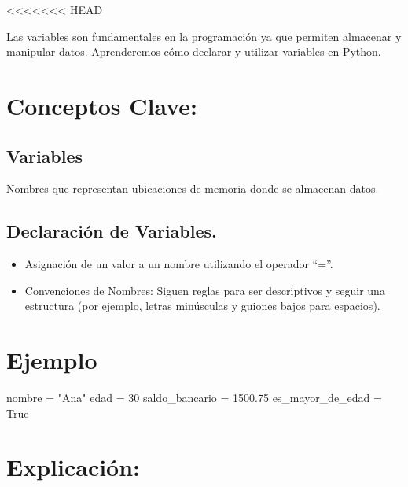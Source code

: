 \documentclass[
  a4paper,
  onepage,
  openany]{scrreprt}
\newenvironment{Shaded}{\begin{snugshade}}{\end{snugshade}}
\newcommand{\DecValTok}[1]{\textcolor[rgb]{0.68,0.00,0.00}{#1}}
\newcommand{\FloatTok}[1]{\textcolor[rgb]{0.68,0.00,0.00}{#1}}
\newcommand{\NormalTok}[1]{\textcolor[rgb]{0.00,0.23,0.31}{#1}}
\newcommand{\OperatorTok}[1]{\textcolor[rgb]{0.37,0.37,0.37}{#1}}
\newcommand{\StringTok}[1]{\textcolor[rgb]{0.13,0.47,0.30}{#1}}
\newcommand{\VariableTok}[1]{\textcolor[rgb]{0.07,0.07,0.07}{#1}}
\providecommand{\tightlist}{%
  \setlength{\itemsep}{0pt}\setlength{\parskip}{0pt}}\usepackage{longtable,booktabs,array}
\begin{document}
\textless\textless\textless\textless\textless\textless\textless{} HEAD

Las variables son fundamentales en la programación ya que permiten
almacenar y manipular datos. Aprenderemos cómo declarar y utilizar
variables en Python.

\hypertarget{conceptos-clave-10}{%
\section{Conceptos Clave:}\label{conceptos-clave-10}}

\hypertarget{variables-3}{%
\subsection{Variables}\label{variables-3}}

Nombres que representan ubicaciones de memoria donde se almacenan datos.

\hypertarget{declaraciuxf3n-de-variables.}{%
\subsection{Declaración de
Variables.}\label{declaraciuxf3n-de-variables.}}

\begin{itemize}
\tightlist
\item
  Asignación de un valor a un nombre utilizando el operador ``=''.
\item
  Convenciones de Nombres: Siguen reglas para ser descriptivos y seguir
  una estructura (por ejemplo, letras minúsculas y guiones bajos para
  espacios).
\end{itemize}

\hypertarget{ejemplo-10}{%
\section{Ejemplo}\label{ejemplo-10}}

\begin{Shaded}
\begin{Highlighting}[]
\NormalTok{nombre }\OperatorTok{=} \StringTok{"Ana"}
\NormalTok{edad }\OperatorTok{=} \DecValTok{30}
\NormalTok{saldo\_bancario }\OperatorTok{=} \FloatTok{1500.75}
\NormalTok{es\_mayor\_de\_edad }\OperatorTok{=} \VariableTok{True}
\end{Highlighting}
\end{Shaded}

\hypertarget{explicaciuxf3n-10}{%
\section{Explicación:}\label{explicaciuxf3n-10}}
\end{document}
